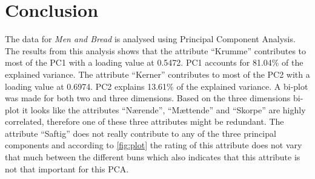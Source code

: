 \section*{Conclusion}
%
The data for \textit{Men and Bread} is analysed using Principal Component Analysis. The results from this analysis shows that the attribute ``Krumme'' contributes to most of the PC1 with a loading value at 0.5472. PC1 accounts for 81.04\% of the explained variance. The attribute ``Kerner'' contributes to most of the PC2 with a loading value at 0.6974. PC2 explains 13.61\% of the explained variance. \blankline
%
A bi-plot was made for both two and three dimensions. Based on the three dimensions bi-plot it looks like the attributes ``Nærende'', ``Mættende'' and ``Skorpe'' are highly correlated, therefore one of these three attributes might be redundant. \blankline
%
The attribute ``Saftig'' does not really contribute to any of the three principal components and according to \autoref{fig:plot} the rating of this attribute does not vary that much between the different buns which also indicates that this attribute is not that important for this PCA.